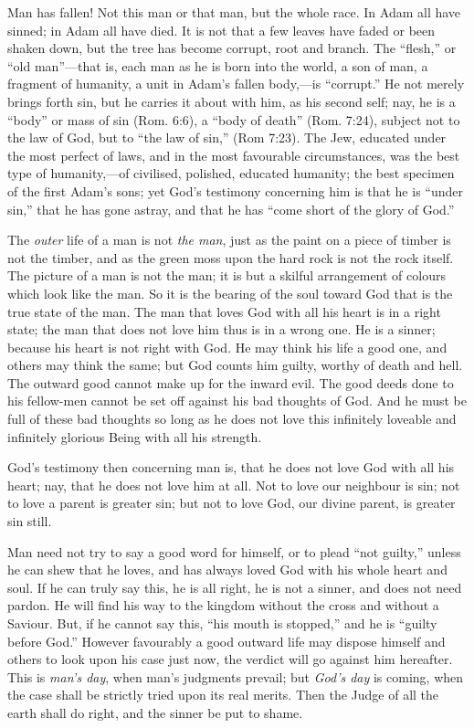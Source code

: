 \documentclass[
]{book}
\begin{document}
Man has fallen! Not this man or that man, but the whole race. In Adam all have sinned; in Adam all have died. It is not that a few leaves have faded or been shaken down, but the tree has become corrupt, root and branch. The ``flesh,'' or ``old man''---that is, each man as he is born into the world, a son of man, a fragment of humanity, a unit in Adam's fallen body,---is ``corrupt.'' He not merely brings forth sin, but he carries it about with him, as his second self; nay, he is a ``body'' or mass of sin (Rom. 6:6), a ``body of death'' (Rom. 7:24), subject not to the law of God, but to ``the law of sin,'' (Rom 7:23). The Jew, educated under the most perfect of laws, and in the most favourable circumstances, was the best type of humanity,---of civilised, polished, educated humanity; the best specimen of the first Adam's sons; yet God's testimony concerning him is that he is ``under sin,'' that he has gone astray, and that he has ``come short of the glory of God.''

The \emph{outer} life of a man is not \emph{the man}, just as the paint on a piece of timber is not the timber, and as the green moss upon the hard rock is not the rock itself. The picture of a man is not the man; it is but a skilful arrangement of colours which look like the man. So it is the bearing of the soul toward God that is the true state of the man. The man that loves God with all his heart is in a right state; the man that does not love him thus is in a wrong one. He is a sinner; because his heart is not right with God. He may think his life a good one, and others may think the same; but God counts him guilty, worthy of death and hell. The outward good cannot make up for the inward evil. The good deeds done to his fellow-men cannot be set off against his bad thoughts of God. And he must be full of these bad thoughts so long as he does not love this infinitely loveable and infinitely glorious Being with all his strength.

God's testimony then concerning man is, that he does not love God with all his heart; nay, that he does not love him at all. Not to love our neighbour is sin; not to love a parent is greater sin; but not to love God, our divine parent, is greater sin still.

Man need not try to say a good word for himself, or to plead ``not guilty,'' unless he can shew that he loves, and has always loved God with his whole heart and soul. If he can truly say this, he is all right, he is not a sinner, and does not need pardon. He will find his way to the kingdom without the cross and without a Saviour. But, if he cannot say this, ``his mouth is stopped,'' and he is ``guilty before God.'' However favourably a good outward life may dispose himself and others to look upon his case just now, the verdict will go against him hereafter. This is \emph{man's day}, when man's judgments prevail; but \emph{God's day} is coming, when the case shall be strictly tried upon its real merits. Then the Judge of all the earth shall do right, and the sinner be put to shame.
\end{document}

